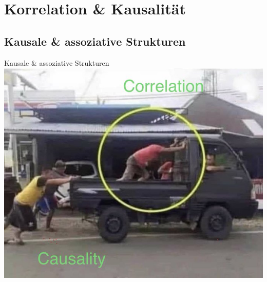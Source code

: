 \documentclass[
  10pt,
  ignorenonframetext,
]{beamer}
\begin{document}
\section{Korrelation \& Kausalität}\label{korrelation-kausalituxe4t}

\subsection{Kausale \& assoziative
Strukturen}\label{kausale-assoziative-strukturen}

\begin{frame}{Kausale \& assoziative Strukturen}
\label{kausale-assoziative-strukturen-1}
\includegraphics[height=.6\textheight]{pics/5-causality-pickup.jpeg}
\end{frame}
\end{document}
